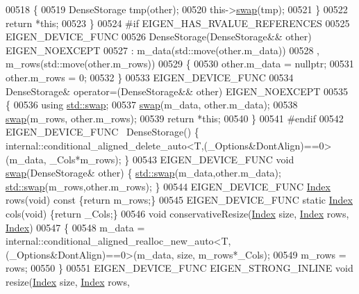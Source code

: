 \begin{DoxyCode}
00518       \{
00519         DenseStorage tmp(other);
00520         this->\hyperlink{endian_8c_a3ca5ecd34b04d6a243c054ac3a57f68d}{swap}(tmp);
00521       \}
00522       \textcolor{keywordflow}{return} *\textcolor{keyword}{this};
00523     \}    
00524 \textcolor{preprocessor}{#if EIGEN\_HAS\_RVALUE\_REFERENCES}
00525     EIGEN\_DEVICE\_FUNC
00526     DenseStorage(DenseStorage&& other) EIGEN\_NOEXCEPT
00527       : m\_data(std::move(other.m\_data))
00528       , m\_rows(std::move(other.m\_rows))
00529     \{
00530       other.m\_data = \textcolor{keyword}{nullptr};
00531       other.m\_rows = 0;
00532     \}
00533     EIGEN\_DEVICE\_FUNC
00534     DenseStorage& operator=(DenseStorage&& other) EIGEN\_NOEXCEPT
00535     \{
00536       \textcolor{keyword}{using} \hyperlink{endian_8c_a3ca5ecd34b04d6a243c054ac3a57f68d}{std::swap};
00537       \hyperlink{endian_8c_a3ca5ecd34b04d6a243c054ac3a57f68d}{swap}(m\_data, other.m\_data);
00538       \hyperlink{endian_8c_a3ca5ecd34b04d6a243c054ac3a57f68d}{swap}(m\_rows, other.m\_rows);
00539       \textcolor{keywordflow}{return} *\textcolor{keyword}{this};
00540     \}
00541 \textcolor{preprocessor}{#endif}
00542     EIGEN\_DEVICE\_FUNC ~DenseStorage() \{ 
      internal::conditional\_aligned\_delete\_auto<T,(\_Options&DontAlign)==0>(m\_data, \_Cols*m\_rows); \}
00543     EIGEN\_DEVICE\_FUNC \textcolor{keywordtype}{void} \hyperlink{endian_8c_a3ca5ecd34b04d6a243c054ac3a57f68d}{swap}(DenseStorage& other) \{ \hyperlink{endian_8c_a3ca5ecd34b04d6a243c054ac3a57f68d}{std::swap}(m\_data,other.m\_data); 
      \hyperlink{endian_8c_a3ca5ecd34b04d6a243c054ac3a57f68d}{std::swap}(m\_rows,other.m\_rows); \}
00544     EIGEN\_DEVICE\_FUNC \hyperlink{namespace_eigen_a62e77e0933482dafde8fe197d9a2cfde}{Index} rows(\textcolor{keywordtype}{void})\textcolor{keyword}{ const }\{\textcolor{keywordflow}{return} m\_rows;\}
00545     EIGEN\_DEVICE\_FUNC \textcolor{keyword}{static} \hyperlink{namespace_eigen_a62e77e0933482dafde8fe197d9a2cfde}{Index} cols(\textcolor{keywordtype}{void}) \{\textcolor{keywordflow}{return} \_Cols;\}
00546     \textcolor{keywordtype}{void} conservativeResize(\hyperlink{namespace_eigen_a62e77e0933482dafde8fe197d9a2cfde}{Index} size, \hyperlink{namespace_eigen_a62e77e0933482dafde8fe197d9a2cfde}{Index} rows, \hyperlink{namespace_eigen_a62e77e0933482dafde8fe197d9a2cfde}{Index})
00547     \{
00548       m\_data = internal::conditional\_aligned\_realloc\_new\_auto<T,(\_Options&DontAlign)==0>(m\_data, size, 
      m\_rows*\_Cols);
00549       m\_rows = rows;
00550     \}
00551     EIGEN\_DEVICE\_FUNC EIGEN\_STRONG\_INLINE \textcolor{keywordtype}{void} resize(\hyperlink{namespace_eigen_a62e77e0933482dafde8fe197d9a2cfde}{Index} size, \hyperlink{namespace_eigen_a62e77e0933482dafde8fe197d9a2cfde}{Index} rows, 

\end{DoxyCode}
